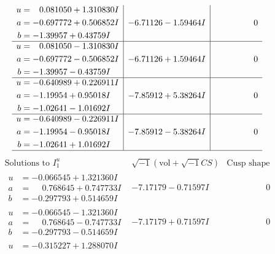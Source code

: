 \documentclass[1p]{elsarticle_modified}
\theoremstyle{definition}
\newcommand{\I}{\sqrt{-1}}
\begin{document}
$$\begin{array}{c|c|c}
\begin{aligned}
u &= \phantom{-}0.081050 + 1.310830 I \\
a &= -0.697772 + 0.506852 I \\
b &= -1.39957 + 0.43759 I\end{aligned}
 & -6.71126 - 1.59464 I & \phantom{-0.000000 } 0 \\ \hline\begin{aligned}
u &= \phantom{-}0.081050 - 1.310830 I \\
a &= -0.697772 - 0.506852 I \\
b &= -1.39957 - 0.43759 I\end{aligned}
 & -6.71126 + 1.59464 I & \phantom{-0.000000 } 0 \\ \hline\begin{aligned}
u &= -0.640989 + 0.226911 I \\
a &= -1.19954 + 0.95018 I \\
b &= -1.02641 - 1.01692 I\end{aligned}
 & -7.85912 + 5.38264 I & \phantom{-0.000000 } 0 \\ \hline\begin{aligned}
u &= -0.640989 - 0.226911 I \\
a &= -1.19954 - 0.95018 I \\
b &= -1.02641 + 1.01692 I\end{aligned}
 & -7.85912 - 5.38264 I & \phantom{-0.000000 } 0\\
 \hline 
 \end{array}$$\newpage$$\begin{array}{c|c|c}  
\text{Solutions to }I^u_{1}& \I (\text{vol} + \sqrt{-1}CS) & \text{Cusp shape}\\
 \hline 
\begin{aligned}
u &= -0.066545 + 1.321360 I \\
a &= \phantom{-}0.768645 + 0.747733 I \\
b &= -0.297793 + 0.514659 I\end{aligned}
 & -7.17179 - 0.71597 I & \phantom{-0.000000 } 0 \\ \hline\begin{aligned}
u &= -0.066545 - 1.321360 I \\
a &= \phantom{-}0.768645 - 0.747733 I \\
b &= -0.297793 - 0.514659 I\end{aligned}
 & -7.17179 + 0.71597 I & \phantom{-0.000000 } 0 \\ \hline\begin{aligned}
u &= -0.315227 + 1.288070 I \\

\end{aligned}
\end{array}$$
\end{document}
